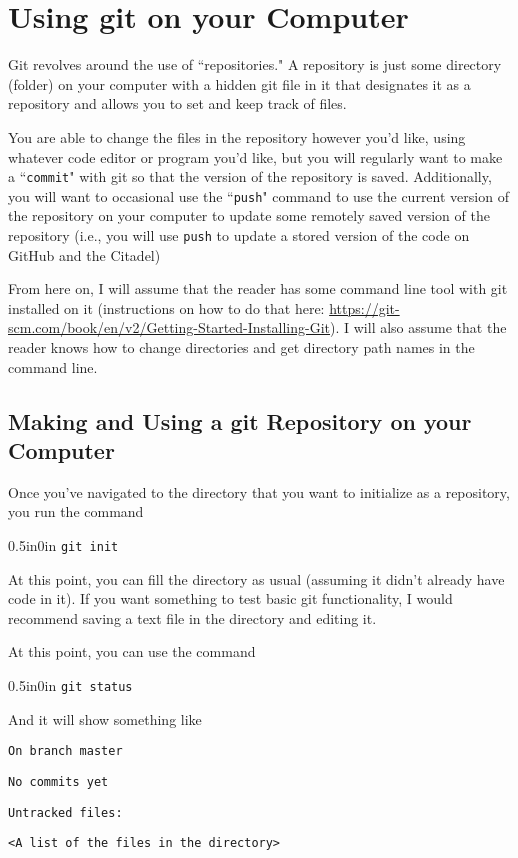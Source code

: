 \documentclass[11pt]{article}
\newcommand{\code}[1]{\begin{adjustwidth}{0.5in}{0in}
    \texttt{#1}
    \end{adjustwidth}}
\begin{document}
\section{Using git on your Computer}

Git revolves around the use of ``repositories."  A repository is just some directory (folder) on your computer with a hidden git file in it that designates it as a repository and allows you to set and keep track of files.

You are able to change the files in the repository however you'd like, using whatever code editor or program you'd like, but you will regularly want to make a ``\texttt{commit}" with git so that the version of the repository is saved.  Additionally, you will want to occasional use the ``\texttt{push}" command to use the current version of the repository on your computer to update some remotely saved version of the repository (i.e., you will use \texttt{push} to update a stored version of the code on GitHub and the Citadel)

From here on, I will assume that the reader has some command line tool with git installed on it (instructions on how to do that here: \url{https://git-scm.com/book/en/v2/Getting-Started-Installing-Git}).  I will also assume that the reader knows how to change directories and get directory path names in the command line.

\subsection{Making and Using a git Repository on your Computer}

Once you've navigated to the directory that you want to initialize as a repository, you run the command

\code{git init}

At this point, you can fill the directory as usual (assuming it didn't already have code in it).  If you want something to test basic git functionality, I would recommend saving a text file in the directory and editing it.

At this point, you can use the command

\code{git status}

And it will show something like

\texttt{On branch master}

\texttt{No commits yet}

\texttt{Untracked files:}

\quad \texttt{<A list of the files in the directory>}
\end{document}
